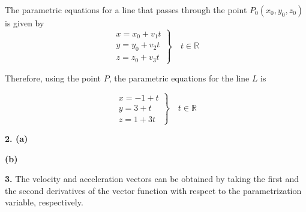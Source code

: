 \documentclass{article}
\begin{document}
The parametric equations for a line that passes through the point $P_0(x_0,y_0,z_0)$ is given by
\[\left.\begin{array}{c}
x=x_0+v_1t\\
y=y_0+v_2t\\
z=z_0+v_3t
\end{array}\right\}\quad t\in\mathbb{R}\]

Therefore, using the point $P$, the parametric equations for the line $L$ is

\[\boxed{\left.\begin{array}{l}
x=-1+t\\
y=3+t\\
z=1+3t
\end{array}\right\}\quad t\in\mathbb{R}}\]

\vspace{1em}

\textbf{2. (a)}
\begin{center}
\end{center}

\newpage

\textbf{(b)}
\begin{center}
\end{center}

\vspace{1em}

\textbf{3.} The velocity and acceleration vectors can be obtained by taking the first and the second derivatives of the vector function with respect to the parametrization variable, respectively.
\end{document}
